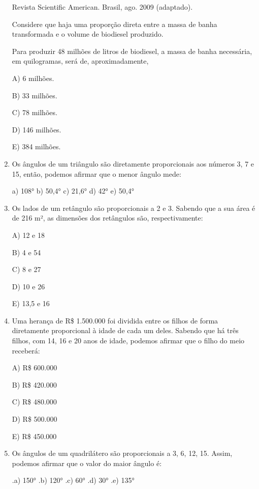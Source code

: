 \begin{multicols*}{2}
\begin{enumerate}
              Revista Scientific American. Brasil, ago. 2009 (adaptado).

              Considere que haja uma proporção direta entre a massa de banha transformada e o volume de biodiesel produzido.

              Para produzir 48 milhões de litros de biodiesel, a massa de banha necessária, em quilogramas, será de, aproximadamente,

              A) 6 milhões.

              B) 33 milhões.

              C) 78 milhões.

              D) 146 milhões.

              E) 384 milhões.

        \item Os ângulos de um triângulo são diretamente proporcionais aos números 3, 7 e 15, então, podemos afirmar que o menor ângulo mede:

              a) 108°  b) 50,4°  c) 21,6°  d) 42°  e) 50,4°

        \item Os lados de um retângulo são proporcionais a 2 e 3. Sabendo que a sua área é de 216 m², as dimensões dos retângulos são, respectivamente:

              A) 12 e 18

              B) 4 e 54

              C) 8 e 27

              D) 10 e 26

              E) 13,5 e 16

        \item Uma herança de R\$ 1.500.000 foi dividida entre os filhos de forma diretamente proporcional à idade de cada um deles. Sabendo que há três filhos, com 14, 16 e 20 anos de idade, podemos afirmar que o filho do meio receberá:

              A) R\$ 600.000

              B) R\$ 420.000

              C) R\$ 480.000

              D) R\$ 500.000

              E) R\$ 450.000

        \item Os ângulos de um quadrilátero são proporcionais a 3, 6, 12, 15. Assim, podemos afirmar que o valor do maior ângulo é:

              .a) 150°  .b) 120°  .c) 60°  .d) 30°  .e) 135°


\end{enumerate}
\end{multicols*}
